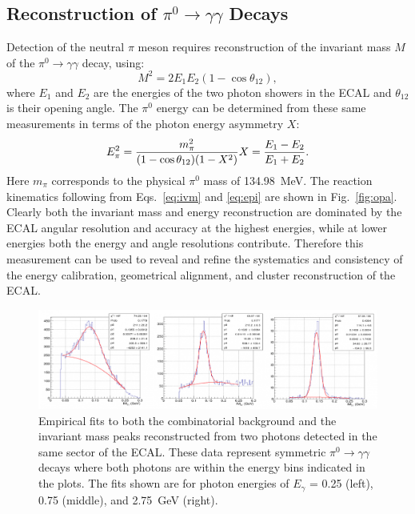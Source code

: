 \subsection{Reconstruction of $\pi^0 \to \gamma \gamma$ Decays}

Detection of the neutral $\pi$ meson requires reconstruction of the invariant mass $M$ of the
$\pi^0 \to \gamma \gamma$ decay, using:
\begin{equation}
M^2 = 2 E_1 E_2 (1-\cos \theta_{12}),
\label{eq:ivm}
\end{equation}
where $E_1$ and $E_2$ are the energies of the two photon showers in the ECAL and $\theta_{12}$ is their opening
angle. The $\pi^0$ energy can be determined from these same measurements in terms of the photon energy
asymmetry $X$:
\begin{equation}
E^2_\pi = \frac{m^2_\pi}{(1-\cos \theta_{12})(1-X^2)}  \\
X=\frac{E_1-E_2}{E_1+E_2}.
\label{eq:epi}
\end{equation}
Here $m_\pi$ corresponds to the physical $\pi^0$ mass of 134.98~MeV. The reaction kinematics following from
Eqs.~\ref{eq:ivm} and \ref{eq:epi} are shown in Fig.~\ref{fig:opa}. Clearly both the invariant mass and energy
reconstruction are dominated by the ECAL angular resolution and accuracy at the highest energies, while at lower
energies both the energy and angle resolutions contribute. Therefore this measurement can be used to reveal and
refine the systematics and consistency of the energy calibration, geometrical alignment, and cluster reconstruction
of the ECAL.

\begin{figure}[h]
\centering
\includegraphics[width=1.0\columnwidth,height=0.3\textwidth]{img/fx-pi0-fits.png}
\caption[]{Empirical fits to both the combinatorial background and the invariant mass peaks reconstructed from
  two photons detected in the same sector of the ECAL. These data represent symmetric
  $\pi^0 \to \gamma \gamma$ decays where both photons are within the energy bins indicated in the plots. The
  fits shown are for photon energies of $E_\gamma$ = 0.25 (left), 0.75 (middle), and 2.75~GeV (right).}
\label{fig:fx-pi0-fits}
\end{figure}

